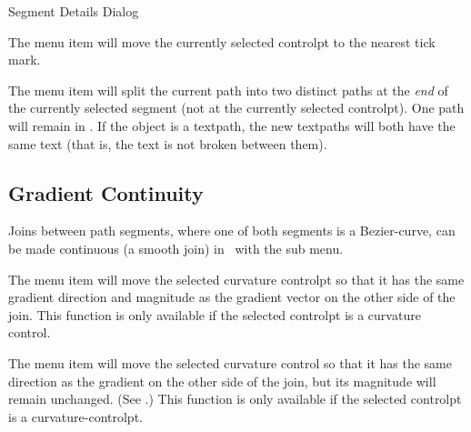 {}
{Segment Details Dialog}


The  menu item will
move the currently selected \gls*{controlpt} to the nearest
tick mark.


The  menu item will split the current path
into two distinct \glspl{path} at the \emph{end} of the currently
selected segment (not at the currently selected \gls*{controlpt}).
One path will remain in \editpathmode. 
If the object is a \gls*{textpath}, the new \glspl*{textpath} will
both have the same text (that is, the text is not broken between
them).


\subsection{Gradient Continuity}\label{sec:continous}

Joins between \gls{path} segments, where one of both segments is a
\gls{Bezier-curve}, can be made continuous (a smooth join)
in \editpathmode\ with the  sub menu.


The  menu item will move the selected
curvature \gls*{controlpt} so that it has the same gradient
direction and magnitude as the gradient vector on the other side of
the join.
This function is only available if the selected \gls{controlpt} is
a curvature control.


The  menu item will move the
selected curvature control so that it has the same direction as the
gradient on the other side of the join, but its magnitude will
remain unchanged. (See .)
This function is only available if the selected \gls{controlpt} is
a \gls{curvature-controlpt}.



